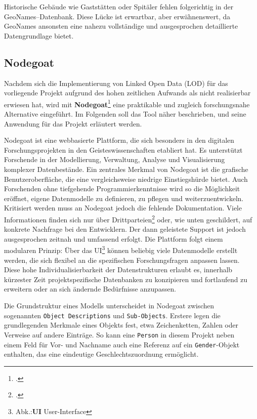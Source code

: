 \documentclass[12pt, a4paper, ngerman, bidi=default]{article}
\let\cite\footcite
\newcommand{\code}[1]{\colorbox{VeryLightGray}{\texttt{#1}}} %
\begin{document}
Historische Gebäude wie Gaststätten oder Spitäler fehlen folgerichtig in der GeoNames–Datenbank. Diese Lücke ist erwartbar, aber erwähnenswert, da GeoNames 
ansonsten eine nahezu vollständige und ausgesprochen detaillierte Datengrundlage bietet.

\subsection{Nodegoat}\label{subsec:Nodegoat_chapter}

Nachdem sich die Implementierung von Linked Open Data (LOD) für das vorliegende Projekt aufgrund des hohen zeitlichen 
Aufwands als nicht realisierbar erwiesen hat, wird mit \textbf{Nodegoat}\cite{kessels_nodegoat_2013}
eine praktikable und zugleich forschungsnahe Alternative eingeführt. Im Folgenden soll das Tool näher beschrieben, und seine Anwendung für das Projekt erläutert werden.

Nodegoat ist eine webbasierte Plattform, die sich besonders in den digitalen Forschungsprojekten in den Geisteswissenschaften etabliert hat. Es unterstützt Forschende in der Modellierung, 
Verwaltung, Analyse und Visualisierung komplexer Datenbestände. Ein zentrales Merkmal von Nodegoat ist die grafische Benutzeroberfläche, die eine vergleichsweise niedrige Einstiegshürde bietet. 
Auch Forschenden ohne tiefgehende Programmierkenntnisse wird so die Möglichkeit  eröffnet, eigene Datenmodelle zu definieren, zu pflegen und weiterzuentwickeln. Kritisiert werden muss an Nodegoat jedoch die fehlende Dokumentation. Viele Informationen finden sich nur über Drittparteien\cite[beispielsweise durch Schulungsunterlagen von Universitäten, 
hier besonders:\\][]{gubler_nodegoat_nodate} oder, wie unten geschildert, auf konkrete Nachfrage bei den Entwicklern. Der dann geleistete Support 
ist jedoch ausgesprochen zeitnah und umfassend erfolgt.
Die Plattform folgt einem modularen Prinzip: Über das UI\footnote{Abk.:\textbf{UI} User-Interface} können beliebig viele Datenmodelle 
erstellt werden, die sich flexibel an die spezifischen Forschungsfragen anpassen lassen. Diese hohe Individualisierbarkeit der Datenstrukturen erlaubt es, innerhalb kürzester Zeit projektspezifische 
Datenbanken zu konzipieren und fortlaufend zu erweitern oder an sich ändernde Bedürfnisse anzupassen.

Die Grundstruktur eines Modells unterscheidet in Nodegoat zwischen sogenannten \code{Object Descriptions} und \code{Sub-Objects}. 
Erstere legen die grundlegenden Merkmale eines Objekts fest, etwa Zeichenketten, Zahlen oder Verweise auf andere Einträge. 
So kann eine \code{Person} in diesem Projekt neben einem Feld für Vor- und Nachname auch eine Referenz auf ein \code{Gender}-Objekt enthalten, 
das eine eindeutige Geschlechtszuordnung ermöglicht.
\end{document}
